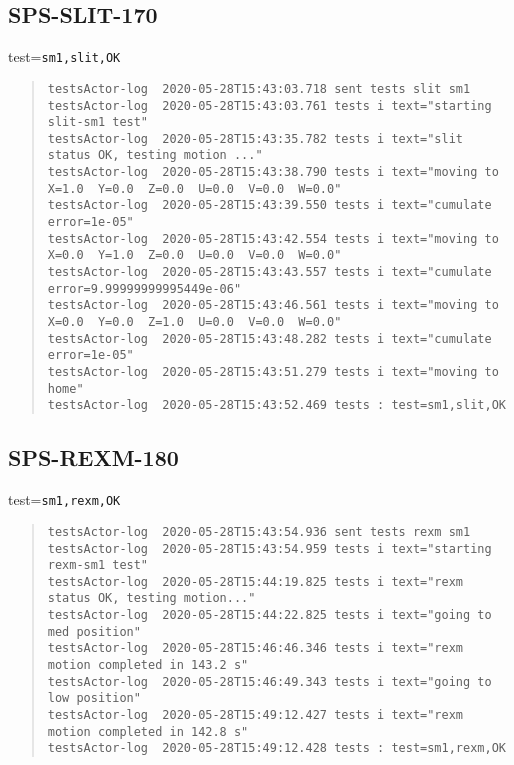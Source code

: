 \subsection{SPS-SLIT-170}
\label{sec:tc-170}

test=\texttt{sm1,slit,OK}

\begin{quote}
\begin{tiny}
\begin{verbatim}
testsActor-log  2020-05-28T15:43:03.718 sent tests slit sm1
testsActor-log  2020-05-28T15:43:03.761 tests i text="starting slit-sm1 test"
testsActor-log  2020-05-28T15:43:35.782 tests i text="slit status OK, testing motion ..."
testsActor-log  2020-05-28T15:43:38.790 tests i text="moving to X=1.0  Y=0.0  Z=0.0  U=0.0  V=0.0  W=0.0"
testsActor-log  2020-05-28T15:43:39.550 tests i text="cumulate error=1e-05"
testsActor-log  2020-05-28T15:43:42.554 tests i text="moving to X=0.0  Y=1.0  Z=0.0  U=0.0  V=0.0  W=0.0"
testsActor-log  2020-05-28T15:43:43.557 tests i text="cumulate error=9.99999999995449e-06"
testsActor-log  2020-05-28T15:43:46.561 tests i text="moving to X=0.0  Y=0.0  Z=1.0  U=0.0  V=0.0  W=0.0"
testsActor-log  2020-05-28T15:43:48.282 tests i text="cumulate error=1e-05"
testsActor-log  2020-05-28T15:43:51.279 tests i text="moving to home"
testsActor-log  2020-05-28T15:43:52.469 tests : test=sm1,slit,OK
\end{verbatim}
\end{tiny}
\end{quote}


\subsection{SPS-REXM-180}
\label{sec:tc-180}

test=\texttt{sm1,rexm,OK}

\begin{quote}
\begin{tiny}
\begin{verbatim}
testsActor-log  2020-05-28T15:43:54.936 sent tests rexm sm1
testsActor-log  2020-05-28T15:43:54.959 tests i text="starting rexm-sm1 test"
testsActor-log  2020-05-28T15:44:19.825 tests i text="rexm status OK, testing motion..."
testsActor-log  2020-05-28T15:44:22.825 tests i text="going to med position"
testsActor-log  2020-05-28T15:46:46.346 tests i text="rexm motion completed in 143.2 s"
testsActor-log  2020-05-28T15:46:49.343 tests i text="going to low position"
testsActor-log  2020-05-28T15:49:12.427 tests i text="rexm motion completed in 142.8 s"
testsActor-log  2020-05-28T15:49:12.428 tests : test=sm1,rexm,OK
\end{verbatim}
\end{tiny}
\end{quote}

